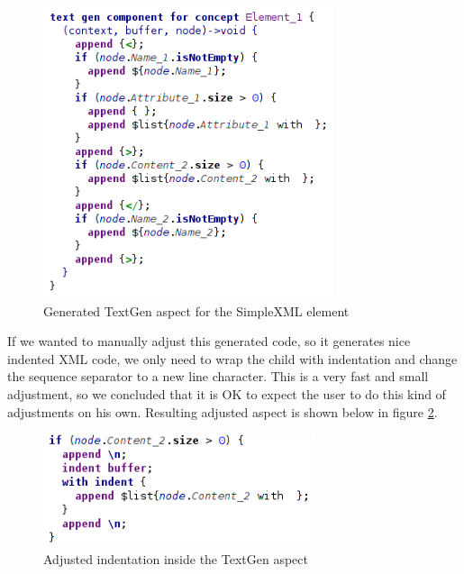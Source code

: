 \begin{figure}[h]
	\centering
	\includegraphics[width=85mm]{./img/textgen_final.png}
	\caption{Generated TextGen aspect for the SimpleXML element}
	\label{fig:textgen_final}
\end{figure}

If we wanted to manually adjust this generated code, so it generates nice indented XML code, we only need to wrap the  child with indentation and change the sequence separator to a new line character.
This is a very fast and small adjustment, so we concluded that it is OK to expect the user to do this kind of adjustments on his own.
Resulting adjusted aspect is shown below in figure \ref{fig:textgen_adjusted}.

\begin{figure}[ht]
	\centering
	\includegraphics[width=80mm]{./img/textgen_adjusted.png}
	\caption{Adjusted indentation inside the TextGen aspect}
	\label{fig:textgen_adjusted}
\end{figure}